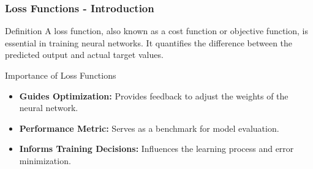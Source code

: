 \documentclass[aspectratio=169]{beamer}
\begin{document}
\begin{frame}[fragile]
  \frametitle{Loss Functions - Introduction}
  \begin{block}{Definition}
    A loss function, also known as a cost function or objective function, is essential in training neural networks. It quantifies the difference between the predicted output and actual target values.
  \end{block}
  
  \begin{block}{Importance of Loss Functions}
    \begin{itemize}
      \item \textbf{Guides Optimization:} Provides feedback to adjust the weights of the neural network.
      \item \textbf{Performance Metric:} Serves as a benchmark for model evaluation.
      \item \textbf{Informs Training Decisions:} Influences the learning process and error minimization.
    \end{itemize}
  \end{block}
\end{frame}
\end{document}

